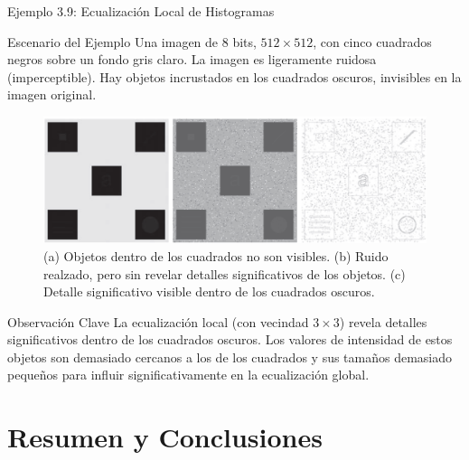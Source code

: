 \documentclass{beamer}
\begin{document}
\begin{frame}{Ejemplo 3.9: Ecualización Local de Histogramas}\tiny
    \begin{block}{\footnotesize Escenario del Ejemplo}
    Una imagen de 8 bits, $512 \times 512$, con cinco cuadrados negros sobre un fondo gris claro. La imagen es ligeramente ruidosa (imperceptible). Hay objetos incrustados en los cuadrados oscuros, invisibles en la imagen original.
    \end{block}

    \begin{figure}
            \includegraphics[width=0.8\linewidth]{figuras/Fig_3_26.png}
            \caption{\tiny (a) Objetos dentro de los cuadrados no son visibles. (b) Ruido realzado, pero sin revelar detalles significativos de los objetos. (c) Detalle significativo visible dentro de los cuadrados oscuros.}
    \end{figure}
    \begin{alertblock}{\tiny Observación Clave}
    La ecualización local (con vecindad $3 \times 3$) revela detalles significativos dentro de los cuadrados oscuros. Los valores de intensidad de estos objetos son demasiado cercanos a los de los cuadrados y sus tamaños demasiado pequeños para influir significativamente en la ecualización global.
    \end{alertblock}
\end{frame}

\section{Resumen y Conclusiones}
\end{document}
